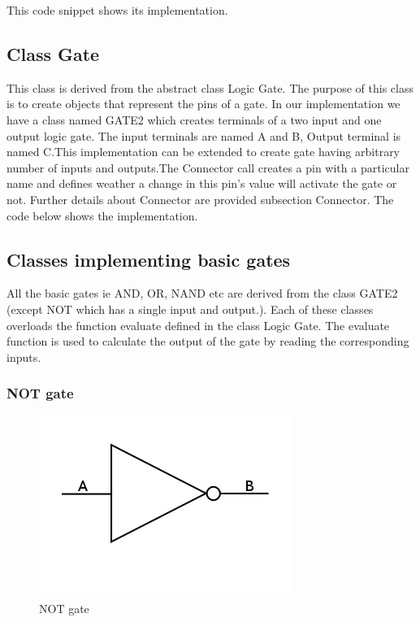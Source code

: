 \documentclass[a4paper,12pt]{article}
\begin{document}
This code snippet shows its implementation.


\subsection{Class Gate}
This class is derived from the abstract class Logic Gate. The purpose of this class is to create objects that represent the pins of a gate. In our implementation we have a class named GATE2 which creates terminals of a two input and one output logic gate. The input terminals are named A and B, Output terminal is named C.This implementation can be extended to create gate having arbitrary number of inputs and outputs.The Connector call creates a pin with a particular name and defines weather a change in this pin's value will activate the gate or not. Further details about Connector are provided subsection Connector.
The code below shows the implementation.


\subsection{Classes implementing basic gates}
All the basic gates ie AND, OR, NAND etc are derived from the class GATE2 (except NOT which has a single input and output.). Each of these classes overloads the function evaluate defined in the class Logic Gate. The evaluate function is used to calculate the output of the gate by reading the corresponding inputs. \\

\subsubsection{NOT gate}

\begin{figure}[h]
\centering
\includegraphics[scale=0.75]{NOT.png}%
\caption{NOT gate}
\end{figure} 
\end{document}
